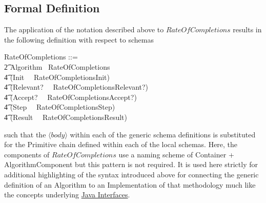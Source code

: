 \documentclass[../main.tex]{subfiles}
\begin{document}
\subsection{Formal Definition}
The application of the notation described above to $RateOfCompletions$ results
in the following definition with respect to schemas
\begin{zed}
  RateOfCompletions ::= \\
  \t2 Algorithm ~\comp RateOfCompletions ~\implies \\
  \t4 (Init ~\comp ~RateOfCompletionsInit) ~ \land \\
  \t4 (Relevant? ~\comp ~RateOfCompletionsRelevant?) ~\land \\
  \t4 (Accept? ~\comp ~RateOfCompletionsAccept?) ~\land \\
  \t4 (Step ~\comp ~RateOfCompletionsStep) ~\land \\
  \t4 (Result ~\comp ~RateOfCompletionsResult)
\end{zed}
such that the $\langle body \rangle$ within each of the generic schema definitions is substituted for
the Primitive chain defined within each of the local schemas. Here, the components of $RateOfCompletions$
use a naming scheme of Container + AlgorithmComponent but this pattern is not required. It is used here
strictly for additional highlighting of the syntax introduced above for connecting the generic
definition of an Algorithm to an Implementation of that methodology much like the concepts underlying
\href{https://docs.oracle.com/javase/tutorial/java/concepts/interface.html}{Java Interfaces}.
\end{document}
